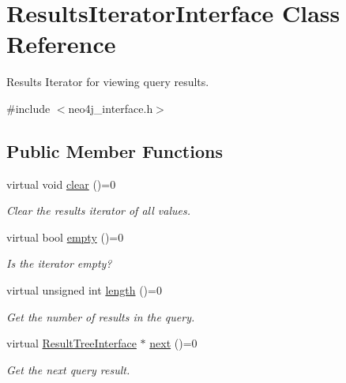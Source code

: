 \hypertarget{classResultsIteratorInterface}{\section{Results\-Iterator\-Interface Class Reference}
\label{classResultsIteratorInterface}
}


Results Iterator for viewing query results.  




{\ttfamily \#include $<$neo4j\-\_\-interface.\-h$>$}

\subsection*{Public Member Functions}
\begin{DoxyCompactItemize}
\item 
\hypertarget{classResultsIteratorInterface_a4f6574b8a57dbd2ea3c86e66bf260252}{virtual void \hyperlink{classResultsIteratorInterface_a4f6574b8a57dbd2ea3c86e66bf260252}{clear} ()=0}\label{classResultsIteratorInterface_a4f6574b8a57dbd2ea3c86e66bf260252}

\begin{DoxyCompactList}\small\item\em Clear the results iterator of all values. \end{DoxyCompactList}\item 
virtual bool \hyperlink{classResultsIteratorInterface_ab00e99e5bd9f186eb9bdcdf30d594b99}{empty} ()=0
\begin{DoxyCompactList}\small\item\em Is the iterator empty? \end{DoxyCompactList}\item 
\hypertarget{classResultsIteratorInterface_a9a022aba2a3e7771c8d147885ca151dd}{virtual unsigned int \hyperlink{classResultsIteratorInterface_a9a022aba2a3e7771c8d147885ca151dd}{length} ()=0}\label{classResultsIteratorInterface_a9a022aba2a3e7771c8d147885ca151dd}

\begin{DoxyCompactList}\small\item\em Get the number of results in the query. \end{DoxyCompactList}\item 
\hypertarget{classResultsIteratorInterface_a00385bfa8ddabb267cf46006a9a0f6e9}{virtual \hyperlink{classResultTreeInterface}{Result\-Tree\-Interface} $\ast$ \hyperlink{classResultsIteratorInterface_a00385bfa8ddabb267cf46006a9a0f6e9}{next} ()=0}\label{classResultsIteratorInterface_a00385bfa8ddabb267cf46006a9a0f6e9}

\begin{DoxyCompactList}\small\item\em Get the next query result. \end{DoxyCompactList}\end{DoxyCompactItemize}


